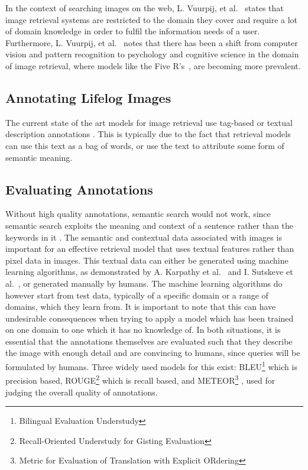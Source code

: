 In the context of searching images on the web,  L. Vuurpij, et al.~\cite{vuurpij2002vind} states that image retrieval systems are restricted to the domain they cover and require a lot of domain knowledge in order to fulfil the information needs of a user. Furthermore, L. Vuurpij, et al.~\cite{vuurpij2002vind} notes that there has been a shift from computer vision and pattern recognition to psychology and cognitive science in the domain of image retrieval, where models like the Five R's~\cite{gurrin2014lifelogging}, are becoming more prevalent. 

\subsection{Annotating Lifelog Images}
The current state of the art models for image retrieval use tag-based or textual description annotations \cite{ali2010semantically}. This is typically due to the fact that retrieval models can use this text as a bag of words, or use the text to attribute some form of semantic meaning.

\subsection{Evaluating Annotations}
Without high quality annotations, semantic search would not work, since semantic search exploits the meaning and context of a sentence rather than the keywords in it \cite{ali2010semantically}. The semantic and contextual data associated with images is important for an effective retrieval model that uses textual features rather than pixel data in images. This textual data can either be generated using machine learning algorithms, as demonstrated by A. Karpathy et al.~\cite{karpathy2015deep} and  I. Sutskeve et al.~\cite{sutskever2011generating}, or generated manually by humans. The machine learning algorithms do however start from test data, typically of a specific domain or a range of domains, which they learn from. It is important to note that this can have undesirable consequences when trying to apply a model which has been trained on one domain to one which it has no knowledge of. In both situations, it is essential that the annotations themselves are evaluated such that they describe the image with enough detail and are convincing to humans, since queries will be formulated by humans. Three widely used models for this exist: BLEU\footnote{Bilingual Evaluation Understudy} \cite{papineni2002bleu} which is precision based, ROUGE\footnote{Recall-Oriented Understudy for Gisting Evaluation} \cite{lin2004rouge} which is recall based, and METEOR\footnote{Metric for Evaluation of Translation with Explicit ORdering} \cite{elliott2013image}, used for judging the overall quality of annotations.

